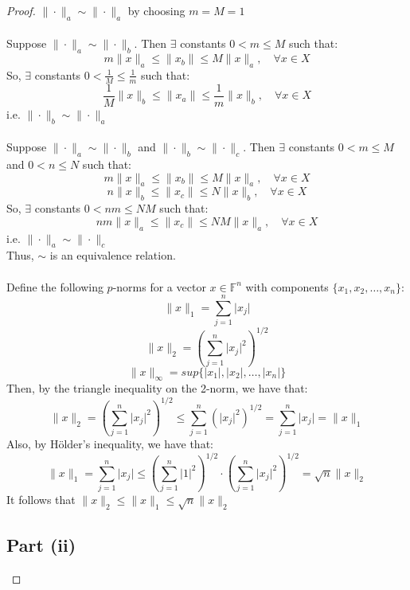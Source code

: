 \documentclass{article}
\begin{document}
\begin{proof}
$\| \cdot \|_a \sim \| \cdot \|_a$ by choosing $m = M = 1$ \\
\\
Suppose $\| \cdot \|_a \sim \| \cdot \|_b$. Then $\exists$ constants $0 < m \leq M$ such that:
$$m\|x\|_a \leq \|x_b\| \leq M\|x\|_{a}, \quad \forall x \in X$$
So, $\exists$ constants $0 < \frac{1}{M} \leq \frac{1}{m}$ such that:
$$\frac{1}{M}\|x\|_b \leq \|x_a\| \leq \frac{1}{m}\|x\|_{b}, \quad \forall x \in X$$
i.e. $\| \cdot \|_b \sim \| \cdot \|_a$ \\
\\
Suppose $\| \cdot \|_a \sim \| \cdot \|_b$ and $\| \cdot \|_b \sim \| \cdot \|_c$. Then $\exists$ constants $0 < m \leq M$ and  $0 < n \leq N$ such that:
$$m\|x\|_a \leq \|x_b\| \leq M\|x\|_{a}, \quad \forall x \in X$$
$$n\|x\|_b \leq \|x_c\| \leq N\|x\|_{b}, \quad \forall x \in X$$
So, $\exists$ constants $0 < nm \leq NM$ such that:
$$nm\|x\|_a \leq \|x_c\| \leq NM\|x\|_{a}, \quad \forall x \in X$$
i.e. $\| \cdot \|_a \sim \| \cdot \|_c$ \\
Thus, $\sim$ is an equivalence relation. \\
\\
Define the following $p$-norms for a vector $x \in \mathbb{F}^n$ with components $\{x_1, x_2, \dots, x_n\}$:
$$\|x\|_1 = \sum\limits_{j = 1}^n \lvert x_j \rvert$$
$$\|x\|_2 = \left( \sum\limits_{j = 1}^n \lvert x_j \rvert ^ 2 \right)^{1 / 2}$$
$$\|x\|_{\infty} = sup\{\lvert x_1 \rvert, \lvert x_2 \rvert, \dots, \lvert x_n \rvert \}$$
Then, by the triangle inequality on the 2-norm, we have that:
$$\|x\|_2 = \left( \sum\limits_{j = 1}^n \lvert x_j \rvert ^ 2\right)^{1 / 2} \leq \sum\limits_{j = 1}^n (\lvert x_j \rvert^2)^{1 / 2}  = \sum\limits_{j = 1}^n \lvert x_j \rvert = \|x\|_1$$
Also, by H\"older's inequality, we have that:
$$\|x\|_1 =  \sum\limits_{j = 1}^n \lvert x_j \rvert \leq \left( \sum\limits_{j = 1}^n \lvert 1 \rvert ^ 2\right)^{1 / 2} \cdot \left( \sum\limits_{j = 1}^n \lvert x_j \rvert ^ 2\right)^{1 / 2} = \sqrt{n}\|x\|_2$$
It follows that $\|x\|_2 \leq \|x\|_1 \leq \sqrt{n}\|x\|_2$

\subsection*{Part (ii)}


\end{proof}
\end{document}
